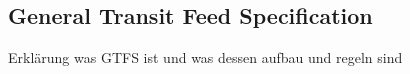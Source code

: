 \subsection{General Transit Feed Specification}
Erklärung was GTFS ist und was dessen aufbau und regeln sind